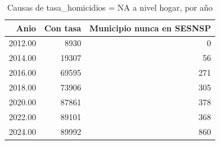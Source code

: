 \begin{table}[ht]
\centering
\caption{Causas de tasa\_homicidios = NA a nivel hogar, por año} 
\label{tab:muni_M2_causas_na_tasa}
\begin{tabular}{rrr}
  \toprule
Anio & Con tasa & Municipio nunca en SESNSP \\ 
  \midrule
2012.00 & 8930 &   0 \\ 
  2014.00 & 19307 &  56 \\ 
  2016.00 & 69595 & 271 \\ 
  2018.00 & 73906 & 305 \\ 
  2020.00 & 87861 & 378 \\ 
  2022.00 & 89101 & 368 \\ 
  2024.00 & 89992 & 860 \\ 
   \bottomrule
\end{tabular}
\end{table}
